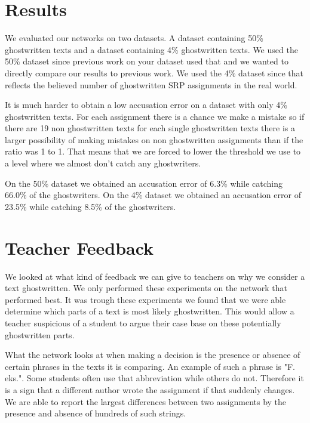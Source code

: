 \documentclass[11pt]{article}
\begin{document}
    \section{Results}

    We evaluated our networks on two datasets. A dataset containing 50\%
    ghostwritten texts and a dataset containing 4\% ghostwritten texts. We used
    the 50\% dataset since previous work on your dataset used that and we wanted
    to directly compare our results to previous work. We used the 4\% dataset
    since that reflects the believed number of ghostwritten SRP assignments in
    the real world.

    It is much harder to obtain a low accusation error on a dataset with
    only 4\% ghostwritten texts. For each assignment there is a chance we
    make a mistake so if there are 19 non ghostwritten texts for each single
    ghostwritten texts there is a larger possibility of making mistakes on non
    ghostwritten assignments than if the ratio was 1 to 1. That means that we
    are forced to lower the threshold we use to a level where we almost don't
    catch any ghostwriters.

    On the 50\% dataset we obtained an accusation error of 6.3\% while catching
    66.0\% of the ghostwriters. On the 4\% dataset we obtained an accusation
    error of 23.5\% while catching 8.5\% of the ghostwriters.


    \section{Teacher Feedback}

    We looked at what kind of feedback we can give to teachers on why we
    consider a text ghostwritten. We only performed these experiments on the
    network that performed best. It was trough these experiments we found that
    we were able determine which parts of a text is most likely ghostwritten.
    This would allow a teacher suspicious of a student to argue their case base
    on these potentially ghostwritten parts.

    What the network looks at when making a decision is the presence or absence
    of certain phrases in the texts it is comparing. An example of such a phrase
    is "F. eks.". Some students often use that abbreviation while others do not.
    Therefore it is a sign that a different author wrote the assignment if that
    suddenly changes. We are able to report the largest differences between two
    assignments by the presence and absence of hundreds of such strings.
\end{document}
